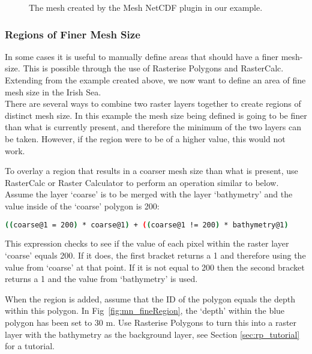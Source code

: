 \begin{figure}[h!]
  \centering
  \caption{The mesh created by the Mesh NetCDF plugin in our example.}
  \label{fig:mn_mesh}
\end{figure}

\subsubsection{Regions of Finer Mesh Size}
In some cases it is useful to manually define areas that should have a finer mesh-size. This is possible through the use of Rasterise Polygons and RasterCalc. Extending from the example created above, we now want to define an area of fine mesh size in the Irish Sea. \\

There are several ways to combine two raster layers together to create regions of distinct mesh size. In this example the mesh size being defined is going to be finer than what is currently present, and therefore the minimum of the two layers can be taken. However, if the region were to be of a higher value, this would not work.

To overlay a region that results in a coarser mesh size than what is present, use RasterCalc or Raster Calculator to perform an operation similar to below. Assume the layer `coarse' is to be merged with the layer `bathymetry' and the value inside of the `coarse' polygon is 200:

\begin{example}
  \begin{lstlisting}[language=bash]
  ((coarse@1 = 200) * coarse@1) + ((coarse@1 != 200) * bathymetry@1)
\end{lstlisting}
\end{example}

This expression checks to see if the value of each pixel within the raster layer `coarse' equals 200. If it does, the first bracket returns a 1 and therefore using the value from `coarse' at that point. If it is not equal to 200 then the second bracket returns a 1 and the value from `bathymetry' is used.

When the region is added, assume that the ID of the polygon equals the depth within this polygon. In Fig~\ref{fig:mn_fineRegion}, the `depth' within the blue polygon has been set to 30 m. Use Rasterise Polygons to turn this into a raster layer with the bathymetry as the background layer, see Section \ref{sec:rp_tutorial} for a tutorial.

